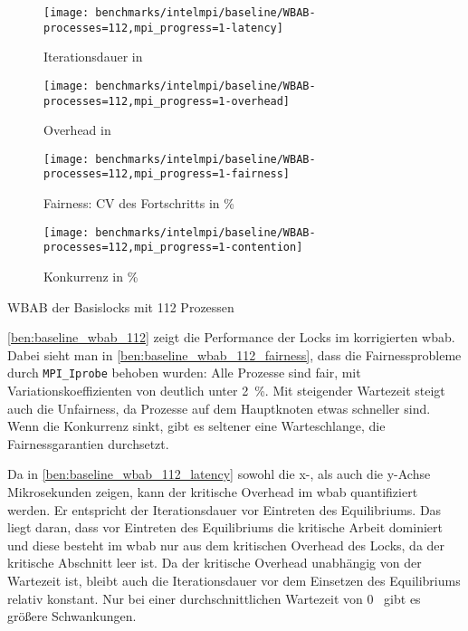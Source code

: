 \begin{benchmark}[h]
    \begin{subfigure}{.5\textwidth}
        \texttt{[image: benchmarks/intelmpi/baseline/WBAB-processes=112,mpi\_progress=1-latency]}
        \caption{Iterationsdauer in }
        \label{ben:baseline_wbab_112_latency}
    \end{subfigure}
    \begin{subfigure}{.5\textwidth}
        \texttt{[image: benchmarks/intelmpi/baseline/WBAB-processes=112,mpi\_progress=1-overhead]}
        \caption{Overhead in }
        \label{ben:baseline_wbab_112_overhead}
    \end{subfigure}
    \begin{subfigure}{.5\textwidth}
        \texttt{[image: benchmarks/intelmpi/baseline/WBAB-processes=112,mpi\_progress=1-fairness]}
        \caption{Fairness: CV des Fortschritts in \%}
        \label{ben:baseline_wbab_112_fairness}
    \end{subfigure}
    \begin{subfigure}{.5\textwidth}
        \texttt{[image: benchmarks/intelmpi/baseline/WBAB-processes=112,mpi\_progress=1-contention]}
        \caption{Konkurrenz in \%}
        \label{ben:baseline_wbab_112_contention}
    \end{subfigure}
    \caption{WBAB der Basislocks mit 112 Prozessen}
    \label{ben:baseline_wbab_112}
\end{benchmark}

\autoref{ben:baseline_wbab_112} zeigt die Performance der Locks im korrigierten \gls{wbab}.
Dabei sieht man in \autoref{ben:baseline_wbab_112_fairness},
dass die Fairnessprobleme durch \texttt{MPI\_Iprobe} behoben wurden:
Alle Prozesse sind fair,
mit Variationskoeffizienten von deutlich unter 2~\%.
Mit steigender Wartezeit steigt auch die Unfairness,
da Prozesse auf dem Hauptknoten etwas schneller sind.
Wenn die \gls{Konkurrenz} sinkt,
gibt es seltener eine Warteschlange,
die Fairnessgarantien durchsetzt.

Da in \autoref{ben:baseline_wbab_112_latency} sowohl die x-, als auch die y-Achse Mikrosekunden zeigen,
kann der kritische Overhead im \gls{wbab} quantifiziert werden.
Er entspricht der Iterationsdauer vor Eintreten des Equilibriums.
Das liegt daran,
dass vor Eintreten des Equilibriums die kritische Arbeit dominiert
und diese besteht im \gls{wbab} nur aus dem kritischen Overhead des Locks,
da der kritische Abschnitt leer ist.
Da der kritische Overhead unabhängig von der Wartezeit ist,
bleibt auch die Iterationsdauer vor dem Einsetzen des Equilibriums relativ konstant.
Nur bei einer durchschnittlichen Wartezeit von 0~ gibt es größere Schwankungen.

